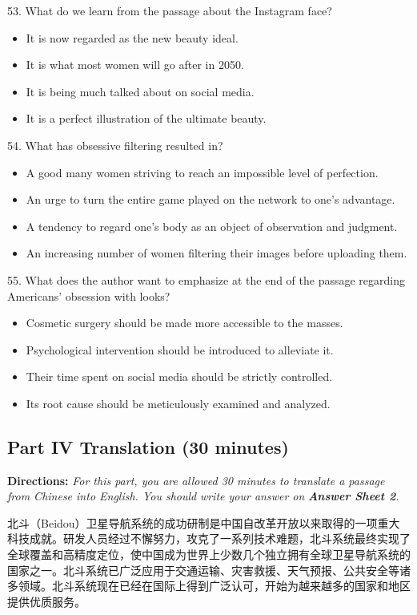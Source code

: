 \documentclass[UTF8,11pt]{ctexart}
\begin{document}
53. What do we learn from the passage about the Instagram face?


\begin{itemize}[leftmargin=2em,itemsep=.2em,topsep=.4em]\item[A.] It is now regarded as the new beauty ideal.
\item[B.] It is what most women will go after in 2050.
\item[C.] It is being much talked about on social media.
\item[D.] It is a perfect illustration of the ultimate beauty.
\end{itemize}

54. What has obsessive filtering resulted in?


\begin{itemize}[leftmargin=2em,itemsep=.2em,topsep=.4em]\item[A.] A good many women striving to reach an impossible level of perfection.
\item[B.] An urge to turn the entire game played on the network to one’s advantage.
\item[C.] A tendency to regard one’s body as an object of observation and judgment.
\item[D.] An increasing number of women filtering their images before uploading them.
\end{itemize}

55. What does the author want to emphasize at the end of the passage regarding Americans’ obsession with looks?


\begin{itemize}[leftmargin=2em,itemsep=.2em,topsep=.4em]\item[A.] Cosmetic surgery should be made more accessible to the masses.
\item[B.] Psychological intervention should be introduced to alleviate it.
\item[C.] Their time spent on social media should be strictly controlled.
\item[D.] Its root cause should be meticulously examined and analyzed.
\end{itemize}

\subsection*{\textbf{Part IV Translation} \textbf{(30 minutes)}}


\textbf{Directions: }\textit{For this part, you are allowed 30 minutes to translate a passage from Chinese into English. You should} \textit{write your answer on }\textbf{\textit{Answer Sheet 2}}\textit{.}


北斗（Beidou）卫星导航系统的成功研制是中国自改革开放以来取得的一项重大科技成就。研发人员经过不懈努力，攻克了一系列技术难题，北斗系统最终实现了全球覆盖和高精度定位，使中国成为世界上少数几个独立拥有全球卫星导航系统的国家之一。北斗系统已广泛应用于交通运输、灾害救援、天气预报、公共安全等诸多领域。北斗系统现在已经在国际上得到广泛认可，开始为越来越多的国家和地区提供优质服务。
\end{document}
